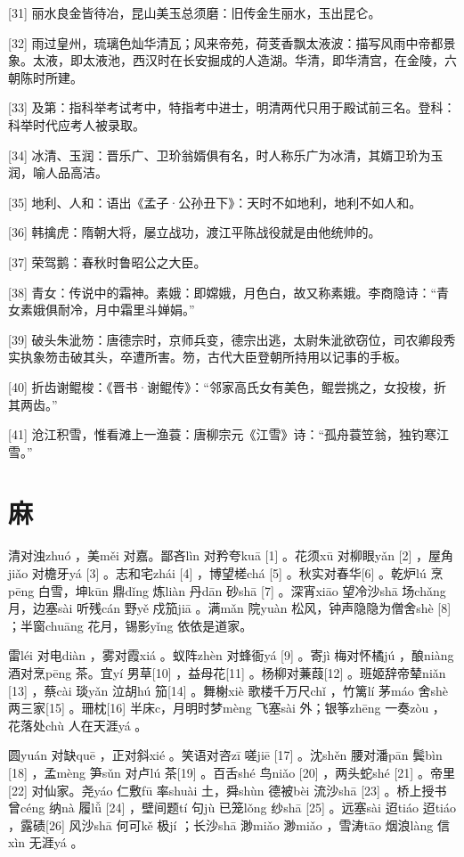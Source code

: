\documentclass[12pt,UTF8]{ctexbook}
\begin{document}
[31] 丽水良金皆待冶，昆山美玉总须磨：旧传金生丽水，玉出昆仑。

[32] 雨过皇州，琉璃色灿华清瓦；风来帝苑，荷芰香飘太液波：描写风雨中帝都景象。太液，即太液池，西汉时在长安掘成的人造湖。华清，即华清宫，在金陵，六朝陈时所建。

[33] 及第：指科举考试考中，特指考中进士，明清两代只用于殿试前三名。登科：科举时代应考人被录取。

[34] 冰清、玉润：晋乐广、卫玠翁婿俱有名，时人称乐广为冰清，其婿卫玠为玉润，喻人品高洁。

[35] 地利、人和：语出《孟子·公孙丑下》：天时不如地利，地利不如人和。

[36] 韩擒虎：隋朝大将，屡立战功，渡江平陈战役就是由他统帅的。

[37] 荣驾鹅：春秋时鲁昭公之大臣。

[38] 青女：传说中的霜神。素娥：即嫦娥，月色白，故又称素娥。李商隐诗：“青女素娥俱耐冷，月中霜里斗婵娟。”

[39] 破头朱泚笏：唐德宗时，京师兵变，德宗出逃，太尉朱泚欲窃位，司农卿段秀实执象笏击破其头，卒遭所害。笏，古代大臣登朝所持用以记事的手板。

[40] 折齿谢鲲梭：《晋书·谢鲲传》：“邻家高氏女有美色，鲲尝挑之，女投梭，折其两齿。”

[41] 沧江积雪，惟看滩上一渔蓑：唐柳宗元《江雪》诗：“孤舟蓑笠翁，独钓寒江雪。”





\chapter{麻}


清对浊zhuó ，美měi 对嘉。鄙吝lìn 对矜夸kuā [1] 。花须xū 对柳眼yǎn [2] ，屋角jiǎo 对檐牙yá [3] 。志和宅zhái [4] ，博望槎chá [5] 。秋实对春华[6] 。乾炉lú 烹pēng 白雪，坤kūn 鼎dǐng 炼liàn 丹dān 砂shā [7] 。深宵xiāo 望冷沙shā 场chǎng 月，边塞sài 听残cán 野yě 戍笳jiā 。满mǎn 院yuàn 松风，钟声隐隐为僧舍shè [8] ；半窗chuāng 花月，锡影yǐng 依依是道家。

雷léi 对电diàn ，雾对霞xiá 。蚁阵zhèn 对蜂衙yá [9] 。寄jì 梅对怀橘jú ，酿niàng 酒对烹pēng 茶。宜yí 男草[10] ，益母花[11] 。杨柳对蒹葭[12] 。班姬辞帝辇niǎn [13] ，蔡cài 琰yǎn 泣胡hú 笳[14] 。舞榭xiè 歌楼千万尺chǐ ，竹篱lí 茅máo 舍shè 两三家[15] 。珊枕[16] 半床c，月明时梦mèng 飞塞sài 外；银筝zhēng 一奏zòu ，花落处chù 人在天涯yá 。

圆yuán 对缺quē ，正对斜xié 。笑语对咨zī 嗟jiē [17] 。沈shěn 腰对潘pān 鬓bìn [18] ，孟mèng 笋sǔn 对卢lú 茶[19] 。百舌shé 鸟niǎo [20] ，两头蛇shé [21] 。帝里[22] 对仙家。尧yáo 仁敷fū 率shuài 土，舜shùn 德被bèi 流沙shā [23] 。桥上授书曾céng 纳nà 履lǚ [24] ，壁间题tí 句jù 已笼lǒng 纱shā [25] 。远塞sài 迢tiáo 迢tiáo ，露碛[26] 风沙shā 何可kě 极jí ；长沙shā 渺miǎo 渺miǎo ，雪涛tāo 烟浪làng 信xìn 无涯yá 。
\end{document}
